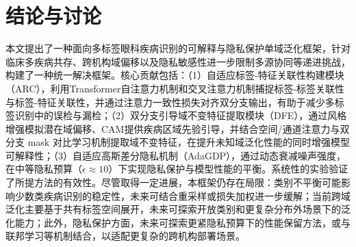 \section{结论与讨论}\label{ux7ed3ux8bbaux4e0eux8ba8ux8bba}

本文提出了一种面向多标签眼科疾病识别的可解释与隐私保护单域泛化框架，针对临床多疾病共存、跨机构域偏移以及隐私敏感性进一步限制多源协同等递进挑战，构建了一种统一解决框架。核心贡献包括：（1）自适应标签-特征关联性构建模块（ARC），利用Transformer自注意力机制和交叉注意力机制捕捉标签-标签关联性与标签-特征关联性，并通过注意力一致性损失对齐双分支输出，有助于减少多标签识别中的误检与漏检；（2）双分支引导域不变特征提取模块（DFE），通过风格增强模拟潜在域偏移、CAM提供疾病区域先验引导，并结合空间/通道注意力与双分支 mask 对比学习机制提取域不变特征，在提升未知域泛化性能的同时增强模型可解释性；（3）自适应高斯差分隐私机制（AdaGDP），通过动态衰减噪声强度，在中等隐私预算（\(\epsilon \approx 10\)）下实现隐私保护与模型性能的平衡。系统性的实验验证了所提方法的有效性。尽管取得一定进展，本框架仍存在局限：类别不平衡可能影响少数类疾病识别的稳定性，未来可结合重采样或损失加权进一步缓解；当前跨域泛化主要基于共有标签空间展开，未来可探索开放类别和更复杂分布外场景下的泛化能力；此外，隐私保护方面，未来可探索更紧隐私预算下的性能保留方法，或与联邦学习等机制结合，以适配更复杂的跨机构部署场景。
